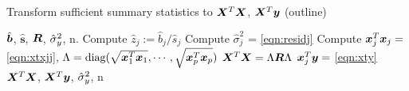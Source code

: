\begin{algorithm}[H] 
\caption{Transform sufficient summary statistics to $\bm X^T \bm X$, $\bm X^T \bm y$ (outline)} \label{alg:ss suff interface}
\begin{algorithmic}[1]
\Require $\hat{\bm b}$, $\hat{\bm{s}}$, $\bm R$, $\hat{\sigma}_y^2$, n.
\State Compute $\hat{z}_j := \hat{b}_{j} / \hat{s}_j $
\State Compute $\hat{\sigma}_{j}^2$ = \eqref{eqn:residj}
\State Compute $\bm x_j^{T}\bm x_j = $ \eqref{eqn:xtxjj}, $\Lambda = \text{diag}(\sqrt{\bm x_1^{T}\bm x_1}, \cdots, \sqrt{\bm x_p^{T}\bm x_p})$
\State $\bm X^T \bm X = \Lambda \bm R \Lambda$
\State $\bm x_j^{T}\bm y = $ \eqref{eqn:xty} \\
\Return $\bm X^T \bm X$, $\bm X^{T}\bm y$, $\hat{\sigma}_y^2$, n
\end{algorithmic}
\end{algorithm}

